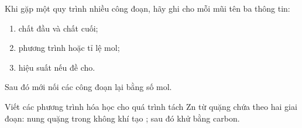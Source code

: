 Khi gặp một quy trình nhiều công đoạn, hãy ghi cho mỗi mũi tên ba thông tin:
\begin{enumerate}
\item chất đầu và chất cuối;
\item phương trình hoặc tỉ lệ mol;
\item hiệu suất nếu đề cho.
\end{enumerate}
Sau đó mới nối các công đoạn lại bằng số mol.

\begin{tuluyen}
Viết các phương trình hóa học cho quá trình tách Zn từ quặng chứa  theo hai giai đoạn: nung quặng trong không khí tạo ; sau đó khử  bằng carbon.
\end{tuluyen}
